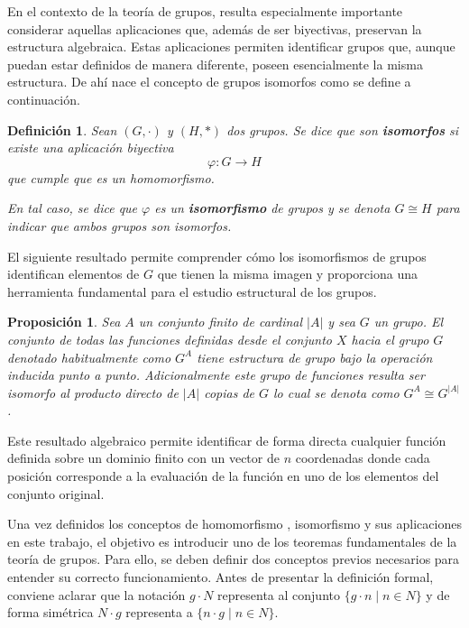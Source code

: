 \documentclass[11pt,a4paper,spanish]{report}
\theoremstyle{plain}
\newtheorem{proposicion}[teorema]{Proposición}
\newtheorem{definicion}{Definición}[chapter]
\begin{document}
En el contexto de la teoría de grupos, resulta especialmente importante considerar aquellas aplicaciones que, además de ser biyectivas, preservan la estructura algebraica. Estas aplicaciones permiten identificar grupos que, aunque puedan estar definidos de manera diferente, poseen esencialmente la misma estructura. De ahí nace el concepto de grupos isomorfos como se define a continuación.


\begin{definicion}\label{isomorfismo}\cite{doerr2013applied}
Sean $(G, \cdot)$ y $(H, \ast)$ dos grupos.  
Se dice que son \textbf{isomorfos} si existe una aplicación biyectiva
\[
\varphi : G \longrightarrow H
\]
que cumple que es un homomorfismo.



En tal caso, se dice que $\varphi$ es un \textbf{isomorfismo} de grupos y se denota $G \cong H$ para indicar que ambos grupos son isomorfos.
\end{definicion}
El siguiente resultado permite comprender cómo los isomorfismos de grupos identifican elementos de $G$ que tienen la misma imagen y proporciona una herramienta fundamental para el estudio estructural de los grupos.


\begin{proposicion} \cite{dummit2004abstract} \label{prop_isomorfismo_funciones}
Sea $A$ un conjunto finito de cardinal $|A|$ y sea $G$ un grupo. El conjunto de todas las funciones definidas desde el conjunto $X$ hacia el grupo $G$ denotado habitualmente como $G^A$ tiene estructura de grupo bajo la operación inducida punto a punto. Adicionalmente este grupo de funciones resulta ser isomorfo al producto directo de $|A|$ copias de $G$ lo cual se denota como $G^A \cong G^{|A|}$.
\end{proposicion}

Este resultado algebraico  permite identificar de forma directa cualquier función definida sobre un dominio finito con un vector de $n$ coordenadas donde cada posición corresponde a la evaluación de la función en uno de los elementos del conjunto original.

Una vez definidos los conceptos de homomorfismo , isomorfismo y sus aplicaciones en este trabajo, el objetivo es introducir uno de los teoremas fundamentales de la teoría de grupos. Para ello, se deben definir dos conceptos previos necesarios para entender su correcto funcionamiento. Antes de presentar la definición formal, conviene aclarar que la notación $g \cdot N$ representa al conjunto $\{g \cdot n \mid n \in N\}$ y de forma simétrica $N \cdot g$ representa a $\{n \cdot g \mid n \in N\}$.
\end{document}
